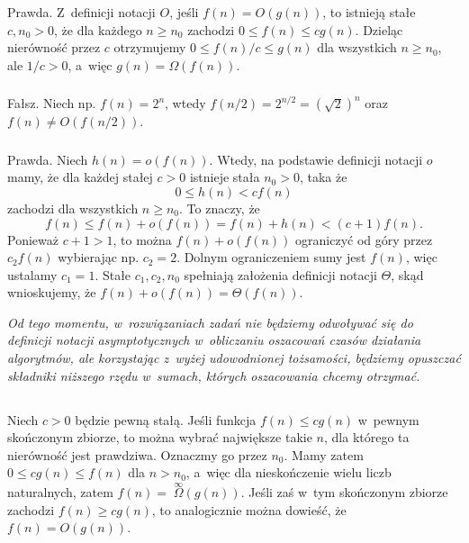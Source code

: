 \subsubsection{} %
Prawda. Z~definicji notacji $O$, jeśli $f(n)=O(g(n))$, to istnieją stałe $c,n_0>0$, że dla każdego $n\ge n_0$ zachodzi $0\le f(n)\le cg(n)$. Dzieląc nierówność przez $c$ otrzymujemy $0\le f(n)/c\le g(n)$ dla wszystkich $n\ge n_0$, ale $1/c>0$, a~więc $g(n)=\Omega(f(n))$.

\subsubsection{} %
Fałsz. Niech np. $f(n)=2^n$, wtedy $f(n/2)=2^{n/2}=\left(\sqrt{2}\right)^n$ oraz $f(n)\ne O(f(n/2))$.

\subsubsection{} %
Prawda. Niech $h(n)=o(f(n))$. Wtedy, na podstawie definicji notacji $o$ mamy, że dla każdej stałej $c>0$ istnieje stała $n_0>0$, taka że
\[
	0\le h(n)<cf(n)
\]
zachodzi dla wszystkich $n\ge n_0$. To znaczy, że
\[
	f(n)\le f(n)+o(f(n))=f(n)+h(n)<(c+1)f(n).
\]
Ponieważ $c+1>1$, to można $f(n)+o(f(n))$ ograniczyć od góry przez $c_2f(n)$ wybierając np. $c_2=2$. Dolnym ograniczeniem sumy jest $f(n)$, więc ustalamy $c_1=1$. Stałe $c_1,c_2,n_0$ spełniają założenia definicji notacji $\Theta$, skąd wnioskujemy, że $f(n)+o(f(n))=\Theta(f(n))$.

\bigskip
\noindent \emph{Od tego momentu, w~rozwiązaniach zadań nie będziemy odwoływać się do definicji notacji asymptotycznych w~obliczaniu oszacowań czasów działania algorytmów, ale korzystając z~wyżej udowodnionej tożsamości, będziemy opuszczać składniki niższego rzędu w~sumach, których oszacowania chcemy otrzymać.}

\subsection{} %

\subsubsection{} %
Niech $c>0$ będzie pewną stałą. Jeśli funkcja $f(n)\le cg(n)$ w~pewnym skończonym zbiorze, to można wybrać największe takie $n$, dla którego ta nierówność jest prawdziwa. Oznaczmy go przez $n_0$. Mamy zatem $0\le cg(n)\le f(n)$ dla $n>n_0$, a~więc dla nieskończenie wielu liczb naturalnych, zatem $f(n)=\;\stackrel{\infty}{\Omega}\!\!(g(n))$. Jeśli zaś w~tym skończonym zbiorze zachodzi $f(n)\ge cg(n)$, to analogicznie można dowieść, że $f(n)=O(g(n))$.

